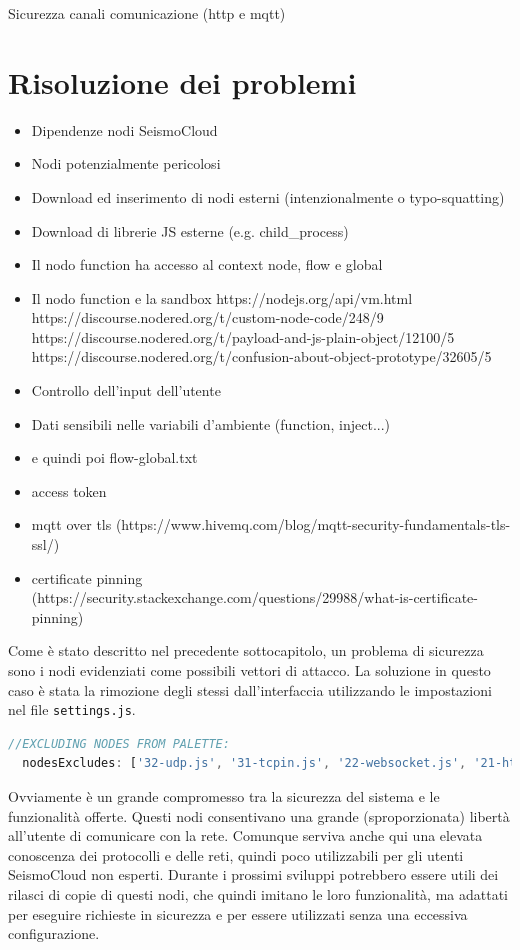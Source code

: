 \documentclass[a4paper,10pt]{memoir}
\begin{document}
Sicurezza canali comunicazione (http e mqtt)


\section{Risoluzione dei problemi}

\begin{itemize}
    \item Dipendenze nodi SeismoCloud
    \item Nodi potenzialmente pericolosi
    \item Download ed inserimento di nodi esterni (intenzionalmente o typo-squatting)
    \item Download di librerie JS esterne (e.g. child\_process)
    \item Il nodo function ha accesso al context node, flow e global
    \item Il nodo function e la sandbox https://nodejs.org/api/vm.html
    https://discourse.nodered.org/t/custom-node-code/248/9
    https://discourse.nodered.org/t/payload-and-js-plain-object/12100/5
    https://discourse.nodered.org/t/confusion-about-object-prototype/32605/5
    \item Controllo dell'input dell'utente
    \item Dati sensibili nelle variabili d'ambiente (function, inject...)
    \item e quindi poi flow-global.txt
    \item access token
    \item mqtt over tls (https://www.hivemq.com/blog/mqtt-security-fundamentals-tls-ssl/)
    \item certificate pinning (https://security.stackexchange.com/questions/29988/what-is-certificate-pinning)
\end{itemize}

Come è stato descritto nel precedente sottocapitolo, un problema di sicurezza sono i nodi evidenziati come possibili vettori di attacco. La soluzione in questo caso è stata la rimozione degli stessi dall'interfaccia utilizzando le impostazioni nel file \texttt{settings.js}.
\begin{lstlisting}[language=Javascript, firstnumber=75]
//EXCLUDING NODES FROM PALETTE:
  nodesExcludes: ['32-udp.js', '31-tcpin.js', '22-websocket.js', '21-httprequest.js', '21-httpin.js', '10-mqtt.js', '06-httpproxy.js', '05-tls.js', '90-exec.js', 'node-red-node-tail', '10-file.js', '23-watch.js'],
\end{lstlisting}
Ovviamente è un grande compromesso tra la sicurezza del sistema e le funzionalità offerte. Questi nodi consentivano una grande (sproporzionata) libertà all'utente di comunicare con la rete. Comunque serviva anche qui una elevata conoscenza dei protocolli e delle reti, quindi poco utilizzabili per gli utenti SeismoCloud non esperti. Durante i prossimi sviluppi potrebbero essere utili dei rilasci di copie di questi nodi, che quindi imitano le loro funzionalità, ma adattati per eseguire richieste in sicurezza e per essere utilizzati senza una eccessiva configurazione.
\end{document}
